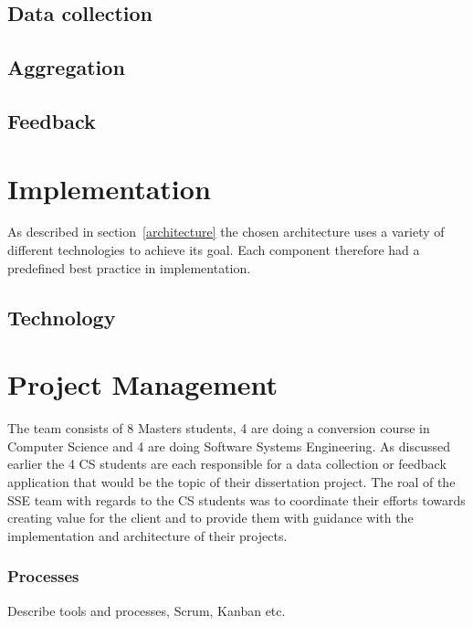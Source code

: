 \documentclass[prodmode,acmtosem]{acmsmall} %
\begin{document}
\subsection{Data collection}

\subsection{Aggregation}


\subsection{Feedback}


\section{Implementation}
As described in section~\ref{architecture} the chosen architecture uses a variety of different technologies to achieve its goal. Each component therefore had a predefined best practice in implementation.


\subsection{Technology}

\section{Project Management}
The team consists of 8 Masters students, 4 are doing a conversion course in Computer Science and 4 are doing Software Systems Engineering. As discussed earlier the 4 CS students are each responsible for a data collection or feedback application that would be the topic of their dissertation project.
The roal of the SSE team with regards to the CS students was to coordinate their efforts towards creating value for the client and to provide them with guidance with the implementation and architecture of their projects.

\subsubsection{Processes}
Describe tools and processes, Scrum, Kanban etc.
\end{document}
